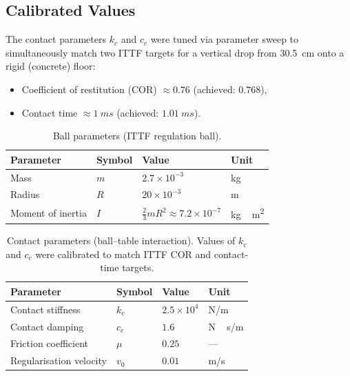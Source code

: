 \documentclass[11pt,a4paper]{article}
\begin{document}
\subsection{Calibrated Values}

The contact parameters $k_c$ and $c_c$ were tuned via parameter sweep to
simultaneously match two ITTF targets for a vertical drop from \SI{30.5}{cm}
onto a rigid (concrete) floor:

\begin{itemize}[nosep]
  \item Coefficient of restitution (COR) $\approx 0.76$
    (achieved: $0.768$),
  \item Contact time $\approx \SI{1}{ms}$
    (achieved: $\SI{1.01}{ms}$).
\end{itemize}

\begin{table}[ht]
\centering
\caption{Ball parameters (ITTF regulation ball).}
\label{tab:ball}
\begin{tabular}{@{}llll@{}}
  \toprule
  Parameter & Symbol & Value & Unit \\
  \midrule
  Mass                & $m$ & $2.7 \times 10^{-3}$ & \si{kg} \\
  Radius              & $R$ & $20 \times 10^{-3}$  & \si{m} \\
  Moment of inertia   & $I$ & $\frac{2}{3}mR^2 \approx 7.2 \times 10^{-7}$
                                                     & \si{kg\,m^2} \\
  \bottomrule
\end{tabular}
\end{table}

\begin{table}[ht]
\centering
\caption{Contact parameters (ball--table interaction). Values of $k_c$ and
$c_c$ were calibrated to match ITTF COR and contact-time targets.}
\label{tab:contact}
\begin{tabular}{@{}llll@{}}
  \toprule
  Parameter & Symbol & Value & Unit \\
  \midrule
  Contact stiffness       & $k_c$ & $2.5 \times 10^4$  & \si{N/m} \\
  Contact damping         & $c_c$ & $1.6$              & \si{N\,s/m} \\
  Friction coefficient    & $\mu$ & $0.25$             & --- \\
  Regularisation velocity & $v_0$ & $0.01$             & \si{m/s} \\
  \bottomrule
\end{tabular}
\end{table}
\end{document}

